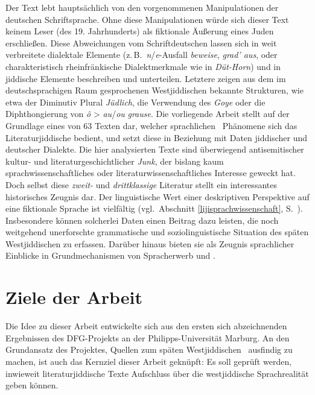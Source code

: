 \largerpage
\noindent Der Text lebt hauptsächlich von den vorgenommenen Manipulationen der deutschen Schriftsprache. Ohne diese Manipulationen würde sich dieser Text keinem Leser (des 19. Jahrhunderts) als fiktionale Äußerung eines Juden erschließen. Diese Abweichungen vom Schriftdeutschen lassen sich in weit verbreitete dialektale Elemente (z.\,B.\, \textit{n}/\textit{e}-Ausfall \textit{beweise}, \textit{grad’ aus}, oder charakteristisch rheinfränkische Dialektmerkmale wie in \textit{Düt-Horn}) und in jiddische Elemente beschreiben und unterteilen. Letztere zeigen aus dem im deutschsprachigen Raum gesprochenen Westjiddischen bekannte Strukturen,  wie etwa der Diminutiv Plural \textit{Jüdlich}, die Verwendung des  \textit{Goye}  oder die Diphthongierung von {\mhd} \textit{ô} > {\wj} \textit{au}/\textit{ou} \textit{grause}. Die vorliegende Arbeit stellt auf der Grundlage eines  von 63 Texten dar, welcher sprachlichen \,%
Phänomene sich das Literaturjiddische bedient, und setzt diese in Beziehung mit Daten jiddischer und deutscher Dialekte. Die hier analysierten Texte sind überwiegend antisemitischer kultur- und literaturgeschichtlicher \textit{Junk}, der bislang kaum sprachwissenschaftliches oder literaturwissenschaftliches Interesse geweckt hat. Doch selbst diese \textit{zweit-} und \textit{drittklassige} Literatur stellt ein interessantes historisches Zeugnis dar. Der linguistische Wert einer deskriptiven Perspektive auf eine fiktionale Sprache ist vielfältig (vgl.\, Abschnitt \ref{lijisprachwissenschaft}, S.\, \pageref{lijisprachwissenschaft}). Insbesondere können solcherlei Daten einen Beitrag dazu leisten, die noch weitgehend unerforschte grammatische und soziolinguistische Situation des späten Westjiddischen zu erfassen. Darüber hinaus bieten sie als Zeugnis sprachlicher  Einblicke in Grundmechanismen von Spracherwerb und . 


\section{Ziele der Arbeit}\label{ziele}	
  
Die Idee zu dieser Arbeit entwickelte sich aus den ersten sich abzeichnenden Ergebnissen des DFG-Projekts  an der Philipps-Universität Marburg. An den Grundansatz des Projektes, Quellen zum späten Westjiddischen \,%
ausfindig zu machen, ist auch das Kernziel dieser Arbeit geknüpft: Es soll geprüft werden, inwieweit literaturjiddische Texte Aufschluss über die westjiddische Sprachrealität geben können.

